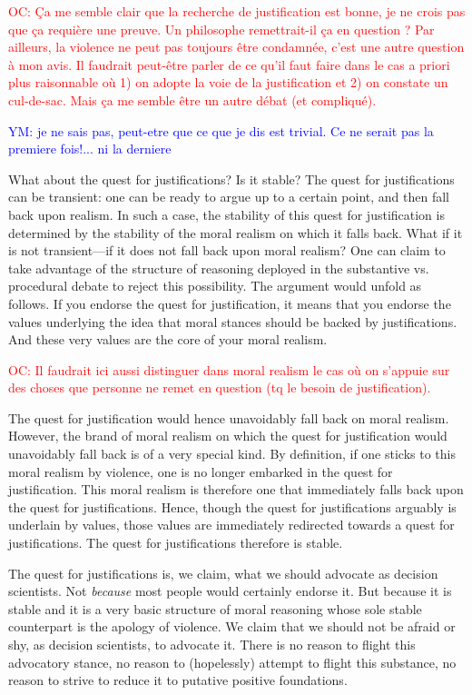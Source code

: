 \documentclass[preprint,11pt]{elsarticle}
\newcommand{\commentYM}[1]{\textcolor{blue}{YM: #1}}
\newcommand{\commentOC}[1]{\textcolor{red}{OC: #1}}
\begin{document}
\commentOC{ Ça me semble clair que la
recherche de justification est bonne, je ne crois pas que ça
requière une preuve. Un philosophe remettrait-il ça en
question ? Par ailleurs, la violence ne peut pas toujours être
condamnée, c’est une autre question à mon avis. Il faudrait
peut-être parler de ce qu’il faut faire dans le cas a priori plus
raisonnable où 1) on adopte la voie de la justification et 2)
on constate un cul-de-sac. Mais ça me semble être un autre
débat (et compliqué).}

\commentYM{je ne sais pas, peut-etre que ce que je dis est trivial. Ce ne serait pas la premiere fois!... ni la derniere}

What about the quest for justifications? Is it stable? The quest for justifications can be transient: one can be ready to argue up to a certain point, and then fall back upon realism. In such a case, the stability of this quest for justification is determined by the stability of the moral realism on which it falls back. What if it is not transient—if it does not fall back upon moral realism? One can claim to take advantage of the structure of reasoning deployed in the substantive vs. procedural debate to reject this possibility. The argument would unfold as follows. If you endorse the quest for justification, it means that you endorse the values underlying the idea that moral stances should be backed by justifications. And these very values are the core of your moral realism.

\commentOC{Il faudrait ici aussi distinguer
dans moral realism le cas où on s’appuie sur des choses que
personne ne remet en question (tq le besoin de
justification).}

The quest for justification would hence unavoidably fall back on moral realism. However, the brand of moral realism on which the quest for justification would unavoidably fall back is of a very special kind. By definition, if one sticks to this moral realism by violence, one is no longer embarked in the quest for justification. This moral realism is therefore one that immediately falls back upon the quest for justifications. Hence, though the quest for justifications arguably is underlain by values, those values are immediately redirected towards a quest for justifications. The quest for justifications therefore is stable.

The quest for justifications is, we claim, what we should advocate as decision scientists. Not \emph{because} most people would certainly endorse it. But because it is stable and it is a very basic structure of moral reasoning whose sole stable counterpart is the apology of violence. We claim that we should not be afraid or shy, as decision scientists, to advocate it. There is no reason to flight this advocatory stance, no reason to (hopelessly) attempt to flight this substance, no reason to strive to reduce it to putative positive foundations.
\end{document}
